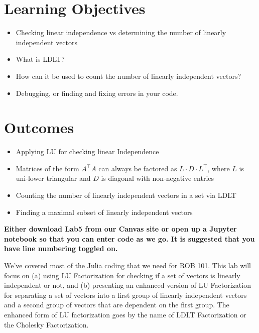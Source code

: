 \section*{Learning Objectives}

\begin{itemize}
\item Checking linear independence vs determining the number of linearly independent vectors
\item  What is LDLT?
\item  How can it be used to count the number of linearly independent vectors?
\item Debugging, or finding and fixing errors in your code.
\end{itemize}

\section*{Outcomes} 
\begin{itemize}
\item Applying LU for checking linear Independence
\item Matrices of the form $A^\top A$ can always be factored as $ L\cdot D \cdot L^\top$, where $L$ is uni-lower triangular and $D$ is diagonal with non-negative entries
\item Counting the number of linearly independent vectors in a set via LDLT
\item Finding a maximal subset of linearly independent vectors
\end{itemize}

\vspace*{1cm}

\textbf{Either download Lab5 from our Canvas site or open up a Jupyter notebook so that you can enter code as we go. It is suggested that you have line numbering toggled on.}  

\newpage

We've covered most of the Julia coding that we need for ROB 101. This lab will focus on (a) using LU Factorization for checking if a set of vectors is linearly independent or not, and (b) presenting an enhanced version of LU Factorization for separating a set of vectors into a first group of linearly independent vectors and a second group of vectors that are dependent on the first group. The enhanced form of LU factorization goes by the name of LDLT Factorization or the Cholesky Factorization.\\



